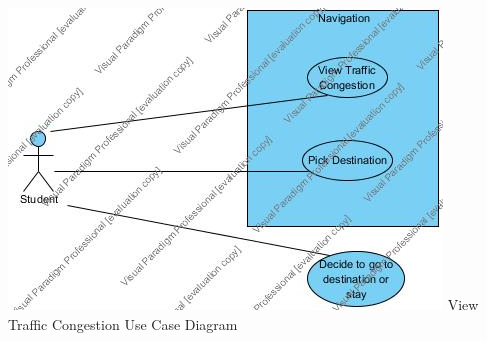 \documentclass[12pt]{article}
\begin{document}
\includegraphics[width=\linewidth]{UseCaseDiagram_ViewTrafficCongestion.jpg}
View Traffic Congestion Use Case Diagram
\end{document}
